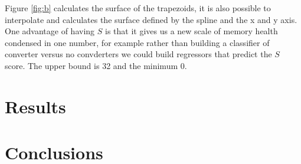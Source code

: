 \documentclass[11pt]{article}
\theoremstyle{definition}
\theoremstyle{remark}
\begin{document}
Figure \ref{fig:b} calculates the surface of the trapezoids, it is also possible to interpolate and calculates the surface defined by the spline and the x and y axis.
One  advantage of having $S$ is that it gives us a new scale of memory health condensed in one number, for example rather than building a classifier of converter versus no convderters we could build regressors that predict the $S$ score. The upper bound is 32 and the minimum 0.


\section{Results}
\label{se:res}


\section{Conclusions}
\label{se:con}

\newpage





\end{document}
